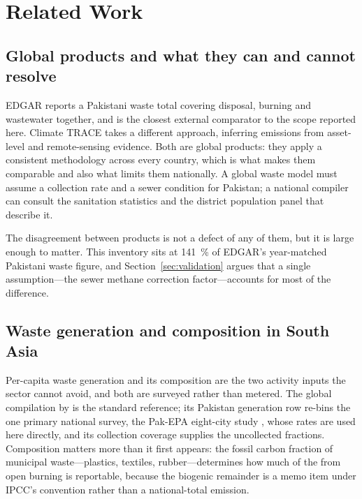 \section{Related Work}
\label{sec:related}

\subsection{Global products and what they can and cannot resolve}

EDGAR \citep{edgar2025booklet,crippa2020} reports a Pakistani waste total covering disposal, burning
and wastewater together, and is the closest external comparator to the scope reported here.
Climate TRACE \citep{climatetrace} takes a different approach, inferring emissions from
asset-level and remote-sensing evidence. Both are global products: they apply a consistent
methodology across every country, which is what makes them comparable and also what limits
them nationally. A global waste model must assume a collection rate and a sewer condition for
Pakistan; a national compiler can consult the sanitation statistics and the district
population panel that describe it.

The disagreement between products is not a defect of any of them, but it is large enough to
matter. This inventory sits at \SI{141}{\percent} of EDGAR's year-matched Pakistani waste
figure, and
Section~\ref{sec:validation} argues that a single assumption---the sewer methane correction
factor---accounts for most of the difference.

\subsection{Waste generation and composition in South Asia}

Per-capita waste generation and its composition are the two activity inputs the sector cannot
avoid, and both are surveyed rather than metered. The global compilation by
\citet{kaza2018} is the standard reference; its Pakistan generation row re-bins the one
primary national survey, the Pak-EPA eight-city study \citep{pakepa1996}, whose rates are
used here directly, and its collection coverage supplies the uncollected fractions.
Composition matters more than it first appears: the fossil carbon fraction of municipal
waste---plastics, textiles, rubber---determines how much of the \COtwo{} from open burning is
reportable, because the biogenic remainder is a memo item under IPCC's convention rather than
a national-total emission.

